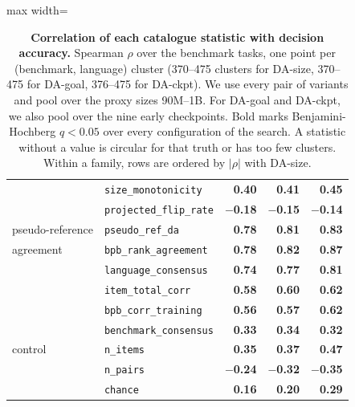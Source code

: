 \begin{table}[t]
\begin{adjustbox}{max width=\textwidth}
\begin{tabular}{@{}llrrr@{}}
 & \texttt{size\_monotonicity} & \textbf{0.40} & \textbf{0.41} & \textbf{0.45} \\
 & \texttt{projected\_flip\_rate} & \textbf{$-$0.18} & \textbf{$-$0.15} & \textbf{$-$0.14} \\
\midrule
pseudo-reference & \texttt{pseudo\_ref\_da} & \textbf{0.78} & \textbf{0.81} & \textbf{0.83} \\
\midrule
agreement & \texttt{bpb\_rank\_agreement} & \textbf{0.78} & \textbf{0.82} & \textbf{0.87} \\
 & \texttt{language\_consensus} & \textbf{0.74} & \textbf{0.77} & \textbf{0.81} \\
 & \texttt{item\_total\_corr} & \textbf{0.58} & \textbf{0.60} & \textbf{0.62} \\
 & \texttt{bpb\_corr\_training} & \textbf{0.56} & \textbf{0.57} & \textbf{0.62} \\
 & \texttt{benchmark\_consensus} & \textbf{0.33} & \textbf{0.34} & \textbf{0.32} \\
\midrule
control & \texttt{n\_items} & \textbf{0.35} & \textbf{0.37} & \textbf{0.47} \\
 & \texttt{n\_pairs} & \textbf{$-$0.24} & \textbf{$-$0.32} & \textbf{$-$0.35} \\
 & \texttt{chance} & \textbf{0.16} & \textbf{0.20} & \textbf{0.29} \\
\bottomrule
\end{tabular}
\end{adjustbox}
\caption{\textbf{Correlation of each catalogue statistic with decision accuracy.} Spearman $\rho$ over the benchmark tasks, one point per (benchmark, language) cluster (370--475 clusters for DA-size, 370--475 for DA-goal, 376--475 for DA-ckpt). We use every pair of variants and pool over the proxy sizes 90M--1B. For DA-goal and DA-ckpt, we also pool over the nine early checkpoints. Bold marks Benjamini-Hochberg $q < 0.05$ over every configuration of the search. A statistic without a value is circular for that truth or has too few clusters. Within a family, rows are ordered by $|\rho|$ with DA-size.}
\label{tab:sur-corr-catalogue}
\end{table}

